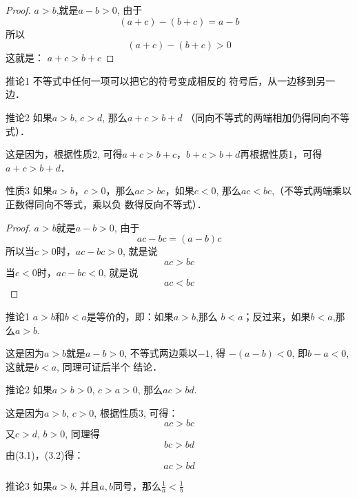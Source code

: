 \begin{proof}
    $a>b$,就是$a-b>0$,
    由于
    $$(a+c)-(b+c)=a-b$$
    所以
    $$(a+c)-(b+c)>0$$
    这就是：
$a+c>b+c$
\end{proof}

\begin{blk}{推论1}
不等式中任何一项可以把它的符号变成相反的
符号后，从一边移到另一边．

\end{blk}

\begin{blk}{推论2}
    如果$a>b$, $c>d$, 那么$a+c>b+d$ （同向不等式的两端相加仍得同向不等式）．
    \end{blk}

这是因为，根据性质2, 可得$a+c>b+c$，$b+c>b+
d$再根据性质1，可得$a+c>b+d$．

\begin{blk}{性质3}
如果$a>b$，$c>0$，那么$ac>bc$，如果$c<0$,
那么$ac<bc$,（不等式两端乘以正数得同向不等式，乘以负
数得反向不等式）．
\end{blk}

\begin{proof}
$a>b$就是$a-b>0$,
由于
$$ac-bc=(a-b)c$$
所以当$c>0$时，$ac-bc>0$, 就是说
$$ac>bc$$
当$c<0$时，$ac-bc<0$, 就是说
$$ac<bc$$
\end{proof}

\begin{blk}{推论1}
   $a>b$和$b<a$是等价的，即：如果$a>b$,那么
$b<a$；反过来，如果$b<a$,那么$a>b$.
\end{blk}

这是因为$a>b$就是$a-b>0$, 不等式两边乘以$-1$, 得
$-(a-b)<0$, 即$b-a<0$, 这就是$b<a$, 同理可证后半个
结论．

\begin{blk}{推论2}
    如果$a>b>0$, $c>a>0$, 那么$ac>bd$.
\end{blk}

 
这是因为$a>b$, $c>0$, 根据性质3, 可得：
\begin{equation}
    ac>bc
\end{equation}
又$c>d$, $b>0$, 同理得
\begin{equation}
    bc>bd
\end{equation}
由(3.1)，(3.2)得：
\begin{equation*}
    ac>bd  \tag{性质1}
\end{equation*}

\begin{blk}{推论3}
    如果$a>b$, 并且$a,b$同号，那么$\frac{1}{a}<\frac{1}{b}$
\end{blk}

